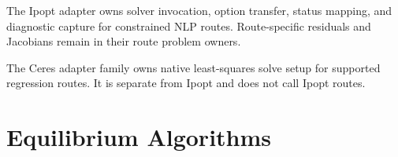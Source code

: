 \documentclass[12pt, letterpaper]{article}
\begin{document}
The Ipopt adapter owns solver invocation, option transfer, status mapping, and
diagnostic capture for constrained NLP routes. Route-specific residuals and
Jacobians remain in their route problem owners.


The Ceres adapter family owns native least-squares solve setup for supported
regression routes. It is separate from Ipopt and does not call Ipopt routes.

\section{Equilibrium Algorithms}

\end{document}
